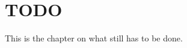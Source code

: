 \documentclass[MachineLearning]{subfiles}
\begin{document}
\section{TODO}
This is the chapter on what still has to be done.
\listoftodos
\end{document}
